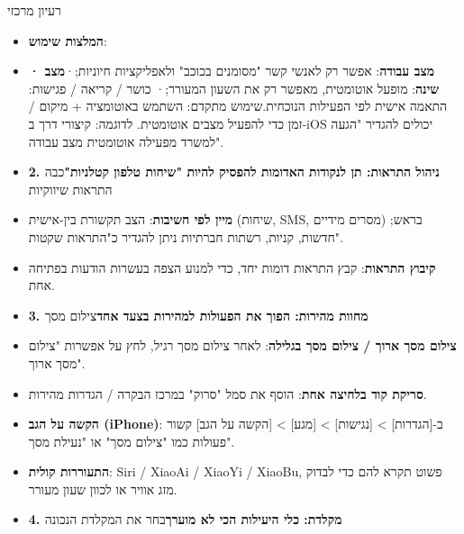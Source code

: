 
רעיון מרכזי


\begin{itemize}
  \item \textbf{המלצות שימוש}:
  \item \textbf{· מצב עבודה}: אפשר רק לאנשי קשר "מסומנים בכוכב" ולאפליקציות חיוניות;\newline ·\textbf{מצב שינה}: מופעל אוטומטית, מאפשר רק את השעון המעורר;\newline · כושר / קריאה / פגישות: התאמה אישית לפי הפעילות הנוכחית.\newline שימוש מתקדם\newline : השתמש באוטומציה + מיקום / זמן כדי להפעיל מצבים אוטומטית. לדוגמה: קיצורי דרך ב-iOS יכולים להגדיר "הגעה למשרד מפעילה אוטומטית מצב עבודה".
  \item \textbf{2. ניהול התראות: תן לנקודות האדומות להפסיק להיות "שיחות טלפון קטלניות"}כבה התראות שיווקיות
\end{itemize}


\begin{itemize}
  \item \textbf{מיין לפי חשיבות}: הצב תקשורת בין-אישית (שיחות, SMS, מסרים מידיים) בראש; חדשות, קניות, רשתות חברתיות ניתן להגדיר כ"התראות שקטות".
  \item \textbf{קיבוץ התראות}: קבץ התראות דומות יחד, כדי למנוע הצפה בעשרות הודעות בפתיחה אחת.
  \item \textbf{3. מחוות מהירות: הפוך את הפעולות למהירות בצעד אחד}צילום מסך
\end{itemize}


\begin{itemize}
  \item \textbf{צילום מסך ארוך / צילום מסך בגלילה}: לאחר צילום מסך רגיל, לחץ על אפשרות "צילום מסך ארוך".
  \item \textbf{סריקת קוד בלחיצה אחת}: הוסף את סמל "סרוק" במרכז הבקרה / הגדרות מהירות.
  \item \textbf{הקשה על הגב (iPhone)}: ב-[הגדרות] > [נגישות] > [מגע] > [הקשה על הגב] קשור פעולות כמו "צילום מסך" או "נעילת מסך".
  \item \textbf{התעוררות קולית}: Siri / XiaoAi / XiaoYi / XiaoBu, פשוט תקרא להם כדי לבדוק מזג אוויר או לכוון שעון מעורר.
  \item \textbf{4. מקלדת: כלי היעילות הכי לא מוערך}בחר את המקלדת הנכונה
\end{itemize}

